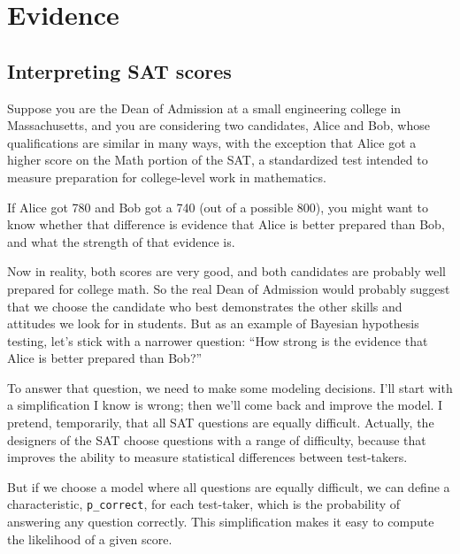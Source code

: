 \documentclass[12pt]{book}
\theoremstyle{exercise}
\begin{document}
\chapter{Evidence}
\label{evidence}


\section{Interpreting SAT scores}

Suppose you are the Dean of Admission at a small engineering
college in Massachusetts, and you are considering two candidates,
Alice and Bob, whose qualifications are similar in many ways,
with the exception that Alice got a higher score on the Math
portion of the SAT, a standardized test intended to measure
preparation for college-level work in mathematics.

If Alice got 780 and Bob got a 740 (out of a possible 800), you might
want to know whether that difference is evidence that Alice is better
prepared than Bob, and what the strength of that evidence is.

Now in reality, both scores are very good, and both
candidates are probably well prepared for college math.  So
the real Dean of Admission would probably suggest that we choose
the candidate who best demonstrates the other skills and
attitudes we look for in students.  But as an example of
Bayesian hypothesis testing, let's stick with a narrower question:
``How strong is the evidence that Alice is better prepared
than Bob?''

To answer that question, we need to make some modeling decisions.
I'll start with a simplification I know is wrong; then we'll come back
and improve the model.  I pretend, temporarily, that
all SAT questions are equally difficult.  Actually, the designers of
the SAT choose questions with a range of difficulty, because that
improves the ability to measure statistical differences between
test-takers.

But if we choose a model where all questions are equally difficult, we
can define a characteristic, \verb"p_correct", for each test-taker,
which is the probability of answering any question correctly.  This
simplification makes it easy to compute the likelihood of a given
score.
\end{document}
